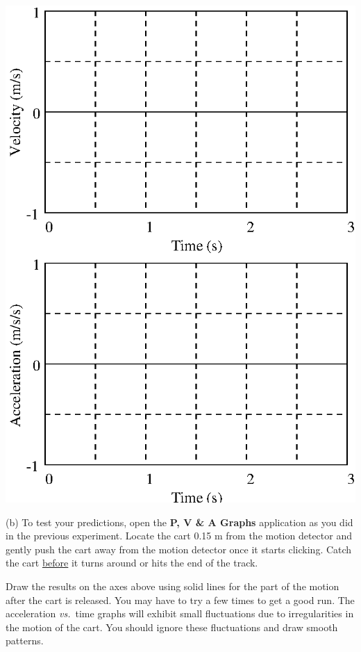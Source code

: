 \vspace{0.3cm}
{\par\centering \includegraphics{slowing/slowing_fig1.eps} \par}
\vspace{0.3cm}

(b) To test your predictions, open the \textbf{P, V \& A Graphs} application as you did in the previous experiment. Locate the cart 0.15 m from the motion detector and gently push the cart away from the motion detector once it starts clicking. Catch the cart \underline{before} it turns around or hits the end of the track.

Draw the results on the axes above using solid lines for the part of the motion
after the cart is released. You may have to try a few times to get a good run.  The acceleration \textit{vs.}~time graphs will exhibit small fluctuations due to irregularities in the motion of the cart. You should ignore these fluctuations and draw smooth patterns.

